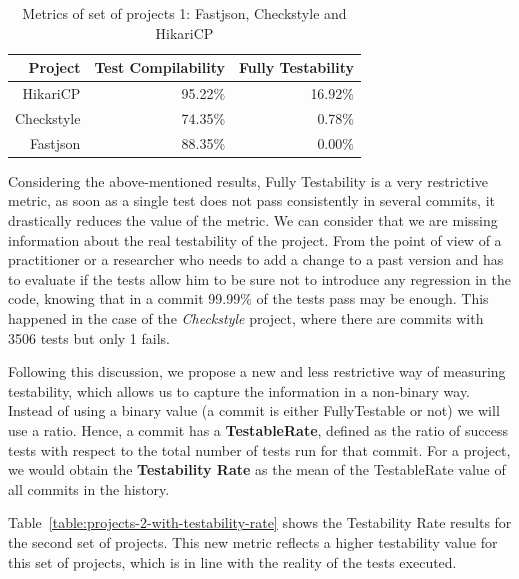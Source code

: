 \begin{figure}[!htb]
\begin{minipage}{.5\linewidth}
        \label{fig:hikari}
    \end{minipage}%
\end{figure}

\begin{table}[h!]
    \centering
    \begin{tabular}{|r|r|r|}
    \hline
    \textbf{Project} & \textbf{Test Compilability} & \textbf{Fully Testability} \\ \hline
    HikariCP         & 95.22\%                      & 16.92\%                      \\ \hline
    Checkstyle       & 74.35\%                      & 0.78\%                      \\ \hline
    Fastjson         & 88.35\%                      & 0.00\%                      \\ \hline
    \end{tabular}
    \caption{Metrics of set of projects 1: Fastjson, Checkstyle and HikariCP}
    \label{table:projects-2}
\end{table}

Considering the above-mentioned results, Fully Testability is a very restrictive metric, as soon as a single test does not pass consistently in several commits, it drastically reduces the value of the metric. 
We can consider that we are missing information about the real testability of the project.
From the point of view of a practitioner or a researcher who needs to add a change to a past version and has to evaluate if the tests allow him to be sure not to introduce any regression in the code, knowing that in a commit 99.99\% of the tests pass may be enough.
This happened in the case of the \textit{Checkstyle} project, where there are commits with 3506 tests but only 1 fails.

Following this discussion, we propose a new and less restrictive way of measuring testability, which allows us to capture the information in a non-binary way. 
Instead of using a binary value (a commit is either FullyTestable or not) we will use a ratio. 
Hence, a commit has a \textbf{TestableRate}, defined as the ratio of success tests with respect to the total number of tests run for that commit.
For a project, we would obtain the \textbf{Testability Rate} as the mean of the TestableRate value of all commits in the history.

Table~\ref{table:projects-2-with-testability-rate} shows the Testability Rate results for the second set of projects.
This new metric reflects a higher testability value for this set of projects, which is in line with the reality of the tests executed.

